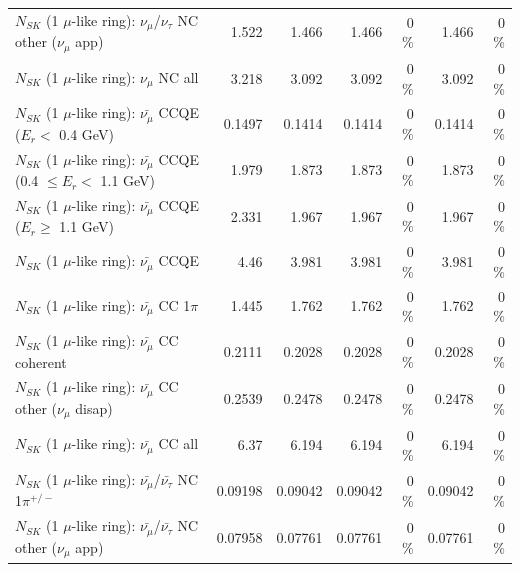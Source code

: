 \begin{table}
\begin{tabular}{| l | r | r | r  r | r  r |}
     $N_{SK}$ (1 $\mu$-like ring): $\nu_\mu$/$\nu_\tau$ NC other ($\nu_\mu$ app) &           1.522 &           1.466 &           1.466 &        0 \%  &           1.466 &        0 \%  \\ 
                                $N_{SK}$ (1 $\mu$-like ring): $\nu_{\mu}$ NC all &           3.218 &           3.092 &           3.092 &        0 \%  &           3.092 &        0 \%  \\ 
\hline
\hline
\hline
          $N_{SK}$ (1 $\mu$-like ring): $\bar{\nu_\mu}$ CCQE ($E_{r} <$ 0.4 GeV) &          0.1497 &          0.1414 &          0.1414 &        0 \%  &          0.1414 &        0 \%  \\ 
 $N_{SK}$ (1 $\mu$-like ring): $\bar{\nu_\mu}$ CCQE (0.4 $\leq E_{r} <$ 1.1 GeV) &           1.979 &           1.873 &           1.873 &        0 \%  &           1.873 &        0 \%  \\ 
       $N_{SK}$ (1 $\mu$-like ring): $\bar{\nu_\mu}$ CCQE ($E_{r} \geq$ 1.1 GeV) &           2.331 &           1.967 &           1.967 &        0 \%  &           1.967 &        0 \%  \\ 
\hline
                              $N_{SK}$ (1 $\mu$-like ring): $\bar{\nu_\mu}$ CCQE &            4.46 &           3.981 &           3.981 &        0 \%  &           3.981 &        0 \%  \\ 
                         $N_{SK}$ (1 $\mu$-like ring): $\bar{\nu_\mu}$ CC 1$\pi$ &           1.445 &           1.762 &           1.762 &        0 \%  &           1.762 &        0 \%  \\ 
                       $N_{SK}$ (1 $\mu$-like ring): $\bar{\nu_\mu}$ CC coherent &          0.2111 &          0.2028 &          0.2028 &        0 \%  &          0.2028 &        0 \%  \\ 
        $N_{SK}$ (1 $\mu$-like ring): $\bar{\nu_\mu}$ CC other ($\nu_\mu$ disap) &          0.2539 &          0.2478 &          0.2478 &        0 \%  &          0.2478 &        0 \%  \\ 
                          $N_{SK}$ (1 $\mu$-like ring): $\bar{\nu_{\mu}}$ CC all &            6.37 &           6.194 &           6.194 &        0 \%  &           6.194 &        0 \%  \\ 
\hline
  $N_{SK}$ (1 $\mu$-like ring): $\bar{\nu_\mu}$/$\bar{\nu_\tau}$ NC 1$\pi^{+/-}$ &         0.09198 &         0.09042 &         0.09042 &        0 \%  &         0.09042 &        0 \%  \\ 
$N_{SK}$ (1 $\mu$-like ring): $\bar{\nu_\mu}$/$\bar{\nu_\tau}$ NC other ($\nu_\mu$ app) &         0.07958 &         0.07761 &         0.07761 &        0 \%  &         0.07761 &        0 \%  \\ 

\end{tabular}
\end{table}
